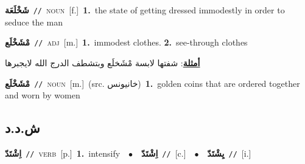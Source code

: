 \documentclass[10pt,a4paper,twoside]{article} %
\begin{document}
\begin{multicols}{2}
{\setlength\topsep{0pt}\textbf{\foreignlanguage{arabic}{شَخْلَعَة}}\ {\color{gray}\texttt{//}\color{black}}\ \textsc{noun}\ [f.]\ \textbf{1.}~the state of getting dressed immodestly in order to seduce the man\ } \vspace{2mm}

{\setlength\topsep{0pt}\textbf{\foreignlanguage{arabic}{مْشَخْلَع}}\ {\color{gray}\texttt{//}\color{black}}\ \textsc{adj}\ [m.]\ \textbf{1.}~immodest clothes.  \textbf{2.}~see-through clothes\  \begin{flushright}\color{gray}\foreignlanguage{arabic}{\textbf{\underline{\foreignlanguage{arabic}{أمثلة}}}: شفتها لابسة مْشَخلَع وبتشطف الدرج الله لايجبرها}\end{flushright}\color{black}} \vspace{2mm}

{\setlength\topsep{0pt}\textbf{\foreignlanguage{arabic}{مْشَخْلَع}}\ {\color{gray}\texttt{//}\color{black}}\ \textsc{noun}\ [m.]\ (src. \color{gray}\foreignlanguage{arabic}{خانيونس}\color{black})\ \textbf{1.}~golden coins that are ordered together and worn by women\ } \vspace{2mm}

\vspace{-3mm}
\subsection*{\color{blue}\foreignlanguage{arabic}{ش.د.د}\color{blue}{}} 

{\setlength\topsep{0pt}\textbf{\foreignlanguage{arabic}{اِشْتَدّ}}\ {\color{gray}\texttt{//}\color{black}}\ \textsc{verb}\ [p.]\ \textbf{1.}~intensify\ \ $\bullet$\ \ \setlength\topsep{0pt}\textbf{\foreignlanguage{arabic}{اِشْتَدّ}}\ {\color{gray}\texttt{//}\color{black}}\ [c.]\ \ $\bullet$\ \ \setlength\topsep{0pt}\textbf{\foreignlanguage{arabic}{يِشْتَدّ}}\ {\color{gray}\texttt{//}\color{black}}\ [i.]\ } \vspace{2mm}


\end{multicols}
\end{document}
